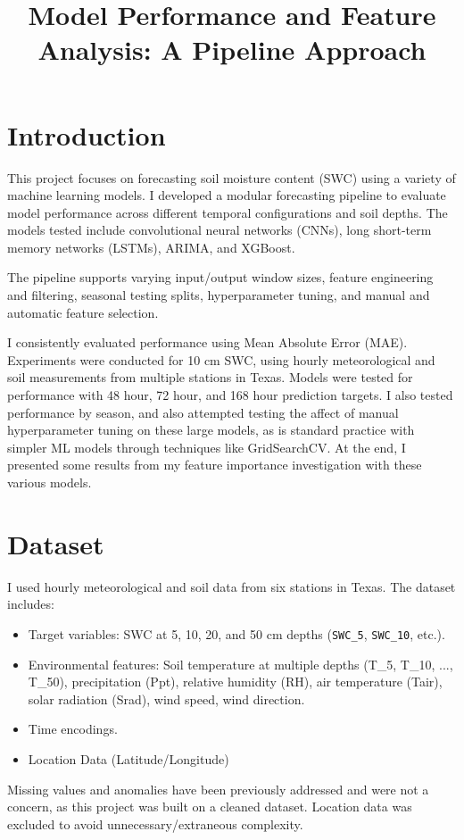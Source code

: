 \documentclass{article}
\title{Model Performance and Feature Analysis: A Pipeline Approach}
\author{}
\date{}
\begin{document}
\maketitle

\section{Introduction}

This project focuses on forecasting soil moisture content (SWC) using a variety of machine learning models. I developed a modular forecasting pipeline to evaluate model performance across different temporal configurations and soil depths. The models tested include convolutional neural networks (CNNs), long short-term memory networks (LSTMs), ARIMA, and XGBoost.

The pipeline supports varying input/output window sizes, feature engineering and filtering, seasonal testing splits, hyperparameter tuning, and manual and automatic feature selection.

I consistently evaluated performance using Mean Absolute Error (MAE). Experiments were conducted for 10 cm SWC, using hourly meteorological and soil measurements from multiple stations in Texas. Models were tested for performance with 48 hour, 72 hour, and 168 hour prediction targets. I also tested performance by season, and also attempted testing the affect of manual hyperparameter tuning on these large models, as is standard practice with simpler ML models through techniques like GridSearchCV. At the end, I presented some results from my feature importance investigation with these various models.

\section{Dataset}
I used hourly meteorological and soil data from six stations in Texas. The dataset includes:
\begin{itemize}
    \item Target variables: SWC at 5, 10, 20, and 50 cm depths (\texttt{SWC\_5}, \texttt{SWC\_10}, etc.).
    \item Environmental features: Soil temperature at multiple depths (T\_5, T\_10, ..., T\_50), precipitation (Ppt), relative humidity (RH), air temperature (Tair), solar radiation (Srad), wind speed, wind direction.
    \item Time encodings.
    \item Location Data (Latitude/Longitude)
\end{itemize}
Missing values and anomalies have been previously addressed and were not a concern, as this project was built on a cleaned dataset. Location data was excluded to avoid unnecessary/extraneous complexity.
\end{document}
